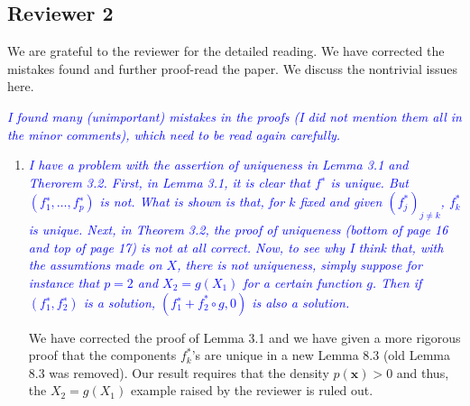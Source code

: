 \documentclass[pdftex,12pt]{article}
\def\E{{\mathbb E}}
\def\rc#1{{\it\textcolor{blue}{#1}}\smallskip}
\begin{document}
\subsection*{Reviewer 2}


We are grateful to the reviewer for the detailed reading. We have corrected the mistakes found and further proof-read the paper. We discuss the nontrivial issues here.  

\rc{I found many (unimportant) mistakes in the proofs (I
  did not mention them all in the minor comments), which need to be
  read again carefully.}

\begin{enumerate}
\item \rc{I have a problem with the assertion of
  uniqueness in Lemma 3.1 and Therorem 3.2. First, in Lemma 3.1, it is
  clear that $f^∗$ is unique. But $(f_1^∗, \ldots, f_p^∗)$ is not. What is
  shown is that, for $k$ fixed and given $(f_j^*)_{j\neq k}$, $f_k^*$ is unique. Next,
  in Theorem 3.2, the proof of uniqueness (bottom of page 16 and top
  of page 17) is not at all correct.
   Now, to see why I think that, with the assumtions made on $X$, there is
   not uniqueness, simply suppose for instance that $p = 2$ and $X_2 = g(X_1)$
   for a certain function $g$. Then if $(f_1^∗, f_2^∗)$ is a solution,
   $(f_1^∗ + f_2^* \circ g, 0)$ is also a solution.}


We have corrected the proof of Lemma 3.1 and we have given a more rigorous proof that the components $f^*_k$'s are unique in a new Lemma 8.3 (old Lemma 8.3 was removed). Our result requires that the density $p(\mathbf{x}) > 0$ and thus, the $X_2 = g(X_1)$ example raised by the reviewer is ruled out. 






\end{enumerate}
\end{document}
